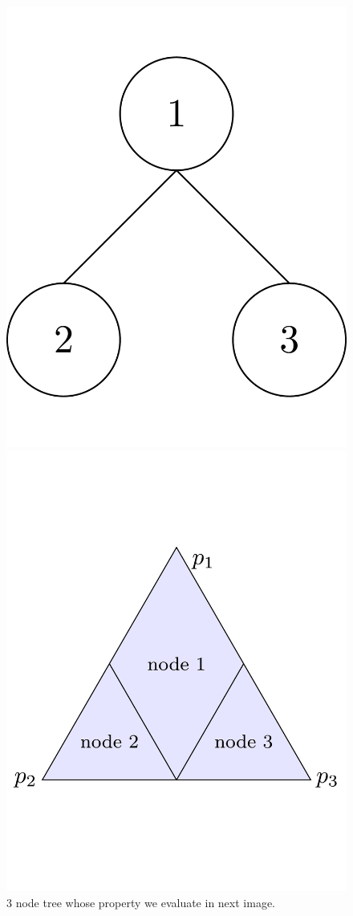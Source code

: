 \documentclass[12pt]{article}
\begin{document}
\begin{figure}
\begin{minipage}{0.45\linewidth}
	\centering
	\includegraphics[width=0.9\linewidth]{tikz/3-node-tree.pdf}
	\caption{3 node tree whose property we evaluate in next image.}
	\label{fig:3-node-tree}
\end{minipage}
\hfill
\begin{minipage}{0.45\linewidth}
	\centering
	\includegraphics[width=0.9\linewidth]{tikz/3-node-tree-prop.pdf}

\end{minipage}
\end{figure}
\end{document}
